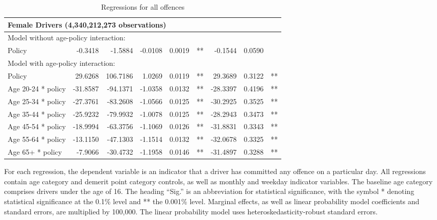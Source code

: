 \begin{table}
\begin{tabular}{l r r r r l r r l}
\hline 

\multicolumn{8}{l}{\textbf{Female Drivers} (4,340,212,273 observations)} \\ 

\hline
\multicolumn{8}{l}{Model without age-policy interaction: } \\ 
Policy                   &  -0.3418        &  -1.5884       &  -0.0108        &  0.0019       &   **       &  -0.1544        &  0.0590       &            \\ 
\hline
\multicolumn{8}{l}{Model with age-policy interaction: } \\ 
Policy                   &  29.6268        &  106.7186       &  1.0269        &  0.0119       &   **       &  29.3689        &  0.3122       &   **       \\ 
Age 20-24 * policy   &  -31.8587        &  -94.1371       &  -1.0358        &  0.0132       &   **       &  -28.3397        &  0.4196       &   **       \\ 
Age 25-34 * policy   &  -27.3761        &  -83.2608       &  -1.0566        &  0.0125       &   **       &  -30.2925        &  0.3525       &   **       \\ 
Age 35-44 * policy   &  -25.9232        &  -79.9932       &  -1.0078        &  0.0125       &   **       &  -28.2943        &  0.3473       &   **       \\ 
Age 45-54 * policy   &  -18.9994        &  -63.3756       &  -1.1069        &  0.0126       &   **       &  -31.8831        &  0.3343       &   **       \\ 
Age 55-64 * policy   &  -13.1150        &  -47.1303       &  -1.1514        &  0.0132       &   **       &  -32.0678        &  0.3325       &   **       \\ 
Age 65+ * policy   &  -7.9066        &  -30.4732       &  -1.1958        &  0.0146       &   **       &  -31.4897        &  0.3288       &   **       \\ 

\hline 

\end{tabular} 
\caption{Regressions for all offences} 
For each regression, the dependent variable is an indicator that a driver has committed  
any offence on a particular day.  
All regressions contain age category and demerit point category controls, 
as well as monthly and weekday indicator variables. 
The baseline age category comprises drivers under the age of 16. 
The heading ``Sig.'' is an abbreviation for statistical significance, with 
the symbol * denoting statistical significance at the 0.1\% level 
and ** the 0.001\% level. 
Marginal effects, as well as linear probability model coefficients and standard errors, are  
multiplied by 100,000.  
The linear probability model uses heteroskedasticity-robust standard errors. 
\label{tab:seas_Logit_vs_LPMx100K_regs} 
\end{table} 
 
